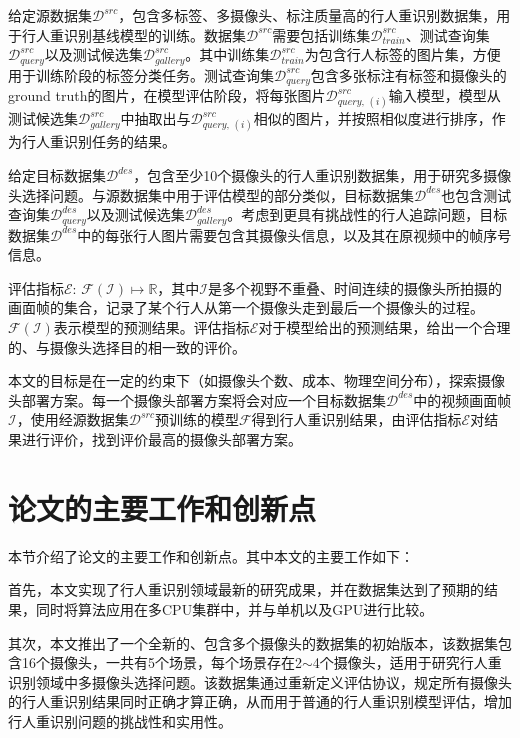 给定源数据集$\mathcal{D}^{src}$，包含多标签、多摄像头、标注质量高的行人重识别数据集，用于行人重识别基线模型的训练。数据集$\mathcal{D}^{src}$需要包括训练集$\mathcal{D}_{train}^{src}$、测试查询集$\mathcal{D}_{query}^{src}$以及测试候选集$\mathcal{D}_{gallery}^{src}$。其中训练集$\mathcal{D}_{train}^{src}$为包含行人标签的图片集，方便用于训练阶段的标签分类任务。测试查询集$\mathcal{D}_{query}^{src}$包含多张标注有标签和摄像头的ground truth的图片，在模型评估阶段，将每张图片$\mathcal{D}_{query,\,(i)}^{src}$输入模型，模型从测试候选集$\mathcal{D}_{gallery}^{src}$中抽取出与$\mathcal{D}_{query,\,(i)}^{src}$相似的图片，并按照相似度进行排序，作为行人重识别任务的结果。

给定目标数据集$\mathcal{D}^{des}$，包含至少10个摄像头的行人重识别数据集，用于研究多摄像头选择问题。与源数据集中用于评估模型的部分类似，目标数据集$\mathcal{D}^{des}$也包含测试查询集$\mathcal{D}_{query}^{des}$以及测试候选集$\mathcal{D}_{gallery}^{des}$。考虑到更具有挑战性的行人追踪问题，目标数据集$\mathcal{D}^{des}$中的每张行人图片需要包含其摄像头信息，以及其在原视频中的帧序号信息。

评估指标$\mathcal{E}:\,\mathcal{F}(\mathcal{I})\mapsto\mathbb{R}$，其中$\mathcal{I}$是多个视野不重叠、时间连续的摄像头所拍摄的画面帧的集合，记录了某个行人从第一个摄像头走到最后一个摄像头的过程。$\mathcal{F}(\mathcal{I})$表示模型的预测结果。评估指标$\mathcal{E}$对于模型给出的预测结果，给出一个合理的、与摄像头选择目的相一致的评价。

本文的目标是在一定的约束下（如摄像头个数、成本、物理空间分布），探索摄像头部署方案。每一个摄像头部署方案将会对应一个目标数据集$\mathcal{D}^{des}$中的视频画面帧$\mathcal{I}$，使用经源数据集$\mathcal{D}^{src}$预训练的模型$\mathcal{F}$得到行人重识别结果，由评估指标$\mathcal{E}$对结果进行评价，找到评价最高的摄像头部署方案。

\section{论文的主要工作和创新点}

本节介绍了论文的主要工作和创新点。其中本文的主要工作如下：

首先，本文实现了行人重识别领域最新的研究成果\cite{sun2017beyond}，并在数据集\cite{zheng2015scalable}达到了预期的结果，同时将算法应用在多CPU集群中，并与单机以及GPU进行比较。

其次，本文推出了一个全新的、包含多个摄像头的数据集的初始版本，该数据集包含16个摄像头，一共有5个场景，每个场景存在2$\sim$4个摄像头，适用于研究行人重识别领域中多摄像头选择问题。该数据集通过重新定义评估协议，规定所有摄像头的行人重识别结果同时正确才算正确，从而用于普通的行人重识别模型评估，增加行人重识别问题的挑战性和实用性。


